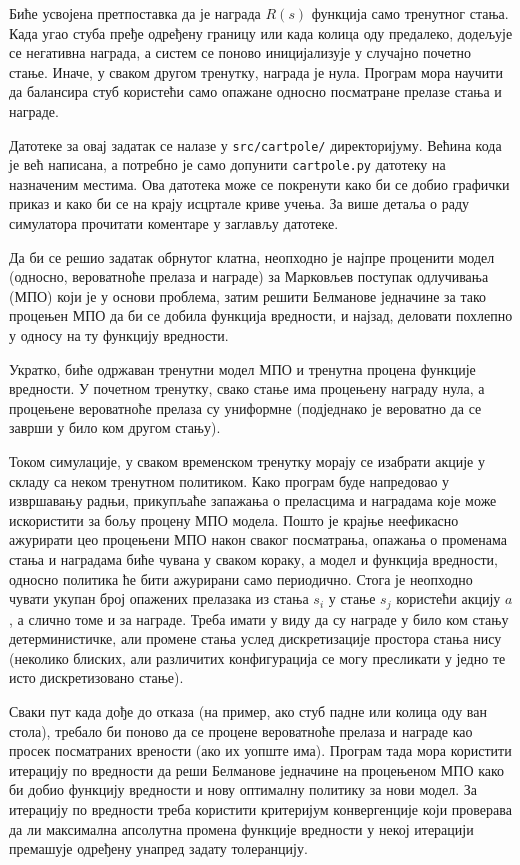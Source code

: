 Биће усвојена претпоставка да је награда $R(s)$ функција само тренутног стања. Када угао стуба пређе одређену границу или када колица оду предалеко, додељује се негативна награда, а систем се поново иницијализује у случајно почетно стање. Иначе, у сваком другом тренутку, награда је нула. Програм мора научити да балансира стуб користећи само опажане односно посматране прелазе стања и награде.

Датотеке за овај задатак се налазе у {\tt src/cartpole/} директоријуму. Већина кода је већ написана, а потребно је само допунити {\tt cartpole.py} датотеку на назначеним местима. Ова датотека може се покренути како би се добио графички приказ и како би се на крају исцртале криве учења. За више детаља о раду симулатора прочитати коментаре у заглављу датотеке.

Да би се решио задатак обрнутог клатна, неопходно је најпре проценити модел (односно, вероватноће прелаза и награде) за Марковљев поступак одлучивања (МПО) који је у основи проблема, затим решити Белманове једначине за тако процењен МПО да би се добила функција вредности, и најзад, деловати похлепно у односу на ту функцију вредности.

Укратко, биће одржаван тренутни модел МПО и тренутна процена функције вредности. У почетном тренутку, свако стање има процењену награду нула, а процењене вероватноће прелаза су униформне (подједнако је вероватно да се заврши у било ком другом стању).

Током симулације, у сваком временском тренутку морају се изабрати акције у складу са неком тренутном политиком. Како програм буде напредовао у извршавању радњи, прикупљаће запажања о преласцима и наградама које може искористити за бољу процену МПО модела. Пошто је крајње неефикасно ажурирати цео процењени МПО након сваког посматрања, опажања о променама стања и наградама биће чувана у сваком кораку, а модел и функција вредности, односно политика ће бити ажурирани само периодично. Стога је неопходно чувати укупан број опажених прелазака из стања $s_i$ у стање $s_j$ користећи акцију $a$ , а слично томе и за награде. Треба имати у виду да су награде у било ком стању детерминистичке, али промене стања услед дискретизације простора стања нису (неколико блиских, али различитих конфигурација се могу пресликати у једно те исто дискретизовано стање).

Сваки пут када дође до отказа (на пример, ако стуб падне или колица оду ван стола), требало би поново да се процене вероватноће прелаза и награде као просек посматраних врености (ако их уопште има). Програм тада мора користити итерацију по вредности да реши Белманове једначине на процењеном МПО како би добио функцију вредности и нову оптималну политику за нови модел. За итерацију по вредности треба користити критеријум конвергенције који проверава да ли максимална апсолутна промена функције вредности у некој итерацији премашује одређену унапред задату толеранцију.

